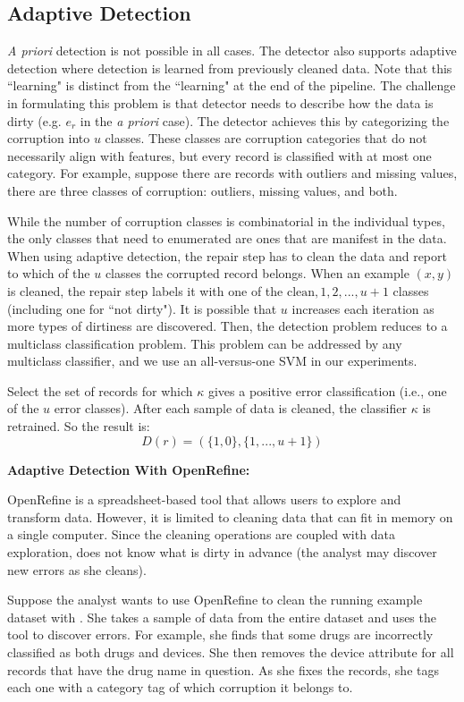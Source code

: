 \subsection{Adaptive Detection}
\emph{A priori} detection is not possible in all cases.
The detector also supports adaptive detection where detection is learned from previously cleaned data.
Note that this ``learning" is distinct from the ``learning" at the end of the pipeline.
The challenge in formulating this problem is that detector needs to describe how the data is dirty (e.g. $e_r$ in the \emph{a priori} case).
The detector achieves this by categorizing the corruption into $u$ classes.
These classes are corruption categories that do not necessarily align with features, but every record is classified with at most one category.
For example, suppose there are records with outliers and missing values, there are three classes of corruption: outliers, missing values, and both.

While the number of corruption classes is combinatorial in the individual types, the only classes that need to enumerated are ones that are manifest in the data.
When using adaptive detection, the repair step has to clean the data and report to which of the $u$ classes the corrupted record belongs.
When an example $(x,y)$ is cleaned, the repair step labels it with one of the ${\text{clean}, 1,2,...,u+1}$ classes (including one for ``not dirty").
It is possible that $u$ increases each iteration as more types of dirtiness are discovered. 
Then, the detection problem reduces to a multiclass classification problem.
This problem can be addressed by any multiclass classifier, and we use an all-versus-one SVM in our experiments.

\begin{definition}
Select the set of records for which $\kappa$ gives a positive error classification (i.e., one of the $u$ error classes).
After each sample of data is cleaned, the classifier $\kappa$ is retrained.
So the result is:
\[D(r) = (\{1,0\},\{1,...,u+1\})\]
\end{definition}

\vspace{0.75em}

\noindent\textbf{Adaptive Detection With OpenRefine: }
\begin{example}
OpenRefine is a spreadsheet-based tool that allows users to explore and transform data.
However, it is limited to cleaning data that can fit in memory on a single computer.
Since the cleaning operations are coupled with data exploration, \sys does not know what is dirty in advance (the analyst may discover new errors as she cleans).

Suppose the analyst wants to use OpenRefine to clean the running example dataset with \sys.
She takes a sample of data from the entire dataset and uses the tool to discover errors.
For example, she finds that some drugs are incorrectly classified as both drugs and devices.
She then removes the device attribute for all records that have the drug name in question.
As she fixes the records, she tags each one with a category tag of which corruption it belongs to.
\end{example}